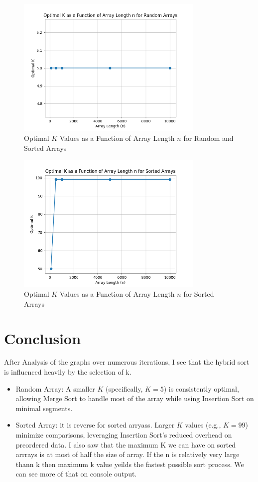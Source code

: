 \documentclass{article}
\begin{document}
\begin{figure}[!ht]
    \centering
    \includegraphics[width=0.8\textwidth]{../optimal_k_comparisons_random.png}
    \caption{Optimal \( K \) Values as a Function of Array Length \( n \) for Random and Sorted Arrays}\label{fig:optimal_k}
\end{figure}

\begin{figure}[!ht]
    \centering
    \includegraphics[width=0.8\textwidth]{../optimal_k_comparisons_sorted.png}
    \caption{Optimal \( K \) Values as a Function of Array Length \( n \) for Sorted Arrays}\label{fig:optimal_k_sorted}
\end{figure}
\section{Conclusion}
After Analysis of the graphs over numerous iterations, I see that the hybrid sort is influenced heavily by the selection of k. 
\begin{itemize}
    \item Random Array: A smaller \( K \) (specifically, \( K = 5 \)) is consistently optimal, allowing Merge Sort to handle most of the array while using Insertion Sort on minimal segments.
    \item Sorted Array: it is reverse for sorted arryass. Larger \( K \) values (e.g., \( K = 99 \)) minimize comparisons, leveraging Insertion Sort’s reduced overhead on preordered data. I also saw that the maximum K we can have on sorted arrrays is at most of half the size of array. If the n is relatively very large thann k then maximum k value yeilds the fastest possible sort process. We can see more of that on console output. 
\end{itemize}
\end{document}
